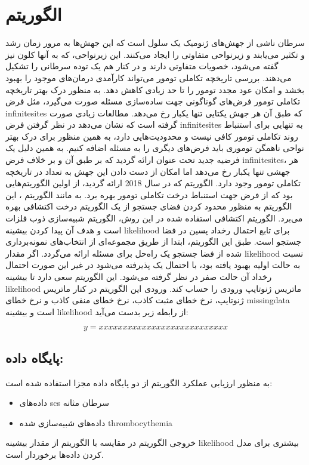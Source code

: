 \section{الگوریتم  \cite{ross2016onconem}}
سرطان ناشی از جهش‌های ژنومیک یک سلول است که این جهش‌ها به مرور زمان رشد و تکثیر می‌یابند و زیرنواحی متفاوتی را ایجاد می‌کنند. این زیرنواحی، که به آنها کلون نیز گفته می‌شود، خصویات متفاوتی دارند و در کنار هم یک توده سرطانی را تشکیل می‌دهند. بررسی تاریخچه تکاملی تومور می‌تواند کارآمدی درمان‌های موجود را بهبود بخشد و امکان عود مجدد تومور را تا حد زیادی کاهش دهد. به منظور درک بهتر تاریخچه تکاملی تومور فرض‌های گوناگونی جهت ساده‌سازی مسئله صورت می‌گیرد، مثل فرض \gls{infinitesites} که طبق آن هر جهش یکتایی تنها یکبار رخ می‌دهد. مطالعات زیادی صورت گرفته است که نشان می‌دهد در نظر گرفتن فرض \gls{infinitesites} به تنهایی برای استنباط روند تکاملی تومور کافی نیست و محدودیت‌هایی دارد، به همین منظور برای درک بهتر نواحی ناهمگن توموری باید فرض‌های دیگری را به مسئله اضافه کنیم. به همین دلیل یک فرضیه جدید تحت عنوان  ارائه گردید که بر طبق آن و بر خلاف فرض \gls{infinitesites}، هر جهشی تنها یکبار رخ می‌دهد اما امکان از دست دادن این جهش به تعداد  در تاریخچه تکاملی تومور وجود دارد. الگوریتم  که در سال 2018 ارائه گردید، از اولین الگوریتم‌هایی بود که از فرض  جهت استنباط درخت تکاملی تومور بهره برد. به مانند الگوریتم ، این الگوریتم به منظور محدود کردن فضای جستجو از یک الگوریتم درخت اکتشافی بهره می‌برد. الگوریتم اکتشافی استفاده شده در این روش، الگوریتم شبیه‌سازی ذوب فلزات است و هدف آن پیدا کردن بیشینه \gls{likelihood} برای تابع احتمال رخداد پسین در فضا جستجو است. طبق این الگوریتم، ابتدا از طریق مجموعه‌ای از انتخاب‌های نمونه‌برداری شده از فضا جستجو یک راه‌حل برای مسئله ارائه می‌گردد. اگر مقدار \gls{likelihood} نسبت به حالت اولیه بهبود یافته بود، با احتمال یک پذیرفته می‌شود در غیر این صورت احتمال رخداد آن حالت صفر در نظر گرفته می‌شود. این الگوریتم سعی دارد تا بیشینه \gls{likelihood} ماتریس ژنوتایپ ورودی را حساب کند. ورودی این الگوریتم در کنار ماتریس ژنوتایپ، نرخ خطای مثبت کاذب، نرخ  خطای منفی کاذب و نرخ خطای \gls{missingdata} است و بیشینه \gls{likelihood} از رابطه زیر بدست می‌آید: 

\begin{equation}
	y=xxxxxxxxxxxxxxxxxxxxxxxxxxx
\end{equation}

\subsection{پایگاه داده: }

به منظور ارزیابی عملکرد الگوریتم  از دو پایگاه داده مجزا استفاده شده است: 
\begin{itemize}
	\item داده‌های \gls{scs} سرطان مثانه
    \item داده‌های شبیه‌سازی شده \gls{thrombocythemia} 
\end{itemize}
خروجی الگوریتم در مقایسه با الگوریتم  از مقدار بیشینه \gls{likelihood} بیشتری برای مدل کردن داده‌ها برخوردار است. 


